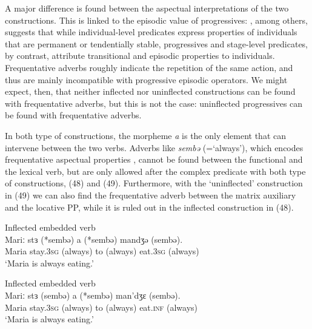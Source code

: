 \documentclass[output=paper]{langsci/langscibook}
\begin{document}
A major difference is found between the aspectual interpretations of the two constructions. This is linked to the episodic value of progressives: \citet{Chierchia1995}, among others, suggests that while individual-level predicates express properties of individuals that are permanent or tendentially stable, progressives and stage-level predicates, by contrast, attribute transitional and episodic properties to individuals. Frequentative adverbs roughly indicate the repetition of the same action, and thus are mainly incompatible with progressive episodic operators. We might expect, then, that neither inflected nor uninflected constructions can be found with frequentative adverbs, but this is not the case: uninflected progressives can be found with frequentative adverbs.

In both type of constructions, the morpheme \textit{a} is the only element that can intervene between the two verbs. Adverbs like \textit{sembə} (=‘always’), which encodes frequentative aspectual properties \citep{Cinque1999}, cannot be found between the functional and the lexical verb, but are only allowed after the complex predicate with both type of constructions, (48) and (49). Furthermore, with the ‘uninflected’ construction in (49) we can also find the frequentative adverb between the matrix auxiliary and the locative PP, while it is ruled out in the inflected construction in (48). 

\ea%
         Inflected embedded verb\label{ex:lorusso:48}\\
    \gll Mariː  stɜ    (*sembə)  a  (*sembə)   mandʒə   (sembə). \\
         Maria  stay.\textsc{3sg} (always)  to   (always)  eat.\textsc{3sg} (always)\\
    \glt ‘Maria is always eating.’
\z


\ea%
         Inflected embedded verb \label{ex:lorusso:49}\\
    \gll Mariː  stɜ     (sembə)   a  (*sembə)  man’dʒɛ  (sembə). \\
         Maria  stay.\textsc{3sg} (always)  to   (always)  eat.\textsc{inf} (always)\\
    \glt ‘Maria is always eating.’
\z
\end{document}

